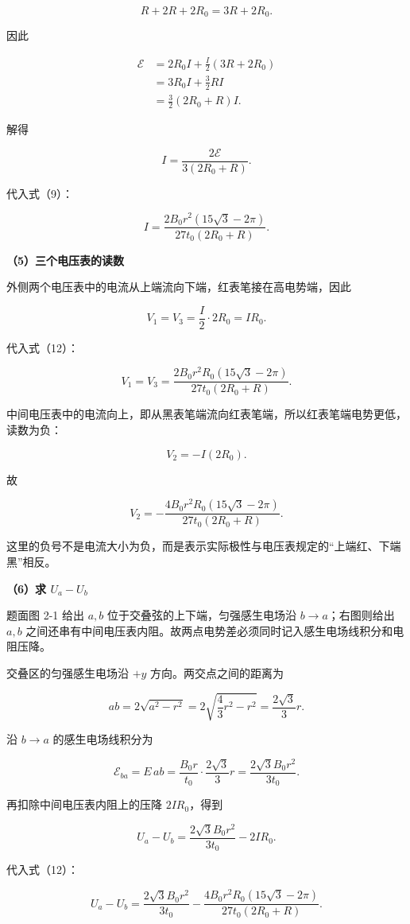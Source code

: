 \documentclass[12pt,a4paper,UTF8]{ctexart}
\begin{document}
\[
R+2R+2R_0=3R+2R_0.
\]

因此

\[
\begin{aligned}
\mathcal E
&=2R_0I+\frac I2(3R+2R_0)\\
&=3R_0I+\frac32RI\\
&=\frac32(2R_0+R)I.
\end{aligned}
\]

解得

\[
\boxed{I=\frac{2\mathcal E}{3(2R_0+R)}}.
\tag{11}
\]

代入式（9）：

\[
I=\frac{2B_0r^2(15\sqrt3-2\pi)}{27t_0(2R_0+R)}.
\tag{12}
\]

\textbf{（5）三个电压表的读数}

外侧两个电压表中的电流从上端流向下端，红表笔接在高电势端，因此

\[
V_1=V_3=\frac I2\cdot2R_0=IR_0.
\]

代入式（12）：

\[
\boxed{
V_1=V_3=
\frac{2B_0r^2R_0(15\sqrt3-2\pi)}
{27t_0(2R_0+R)}
}.
\tag{13}
\]

中间电压表中的电流向上，即从黑表笔端流向红表笔端，所以红表笔端电势更低，读数为负：

\[
V_2=-I(2R_0).
\]

故

\[
\boxed{
V_2=-\frac{4B_0r^2R_0(15\sqrt3-2\pi)}
{27t_0(2R_0+R)}
}.
\tag{14}
\]

这里的负号不是电流大小为负，而是表示实际极性与电压表规定的``上端红、下端黑''相反。

\textbf{（6）求 \(U_a-U_b\)}

题面图 2-1 给出 \(a,b\) 位于交叠弦的上下端，匀强感生电场沿
\(b\to a\)；右图则给出 \(a,b\)
之间还串有中间电压表内阻。故两点电势差必须同时记入感生电场线积分和电阻压降。

交叠区的匀强感生电场沿 \(+y\) 方向。两交点之间的距离为

\[
ab=2\sqrt{a^2-r^2}
=2\sqrt{\frac43r^2-r^2}
=\frac{2\sqrt3}{3}r.
\tag{15}
\]

沿 \(b\to a\) 的感生电场线积分为

\[
\mathcal E_{ba}=E\,ab
=\frac{B_0r}{t_0}\cdot\frac{2\sqrt3}{3}r
=\frac{2\sqrt3B_0r^2}{3t_0}.
\tag{16}
\]

再扣除中间电压表内阻上的压降 \(2IR_0\)，得到

\[
U_a-U_b=\frac{2\sqrt3B_0r^2}{3t_0}-2IR_0.
\]

代入式（12）：

\[
\boxed{
U_a-U_b=
\frac{2\sqrt3B_0r^2}{3t_0}
-\frac{4B_0r^2R_0(15\sqrt3-2\pi)}
{27t_0(2R_0+R)}
}.
\tag{17}
\]
\end{document}

